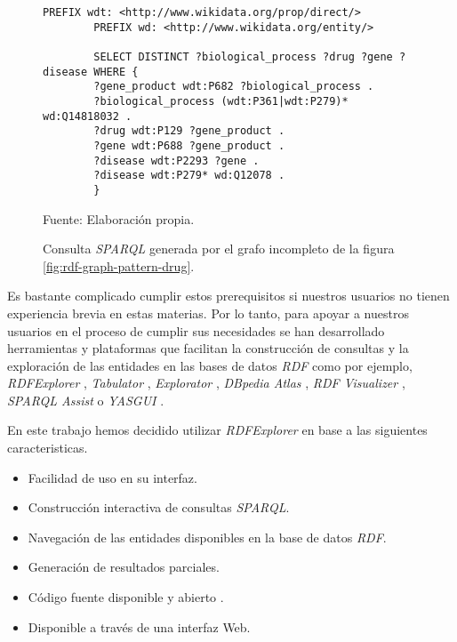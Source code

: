 \begin{figure}[ht]
    \begin{lstlisting}[language=SPARQL]
        PREFIX wdt: <http://www.wikidata.org/prop/direct/>
        PREFIX wd: <http://www.wikidata.org/entity/>
        
        SELECT DISTINCT ?biological_process ?drug ?gene ?disease WHERE {
        ?gene_product wdt:P682 ?biological_process .
        ?biological_process (wdt:P361|wdt:P279)* wd:Q14818032 .
        ?drug wdt:P129 ?gene_product .
        ?gene wdt:P688 ?gene_product .
        ?disease wdt:P2293 ?gene .
        ?disease wdt:P279* wd:Q12078 .
        }
    \end{lstlisting}
    \caption{Consulta \textit{SPARQL} generada por el grafo incompleto de la figura \ref{fig:rdf-graph-pattern-drug}.} Fuente: Elaboración propia.
    \label{code:sparql-query-drug}
\end{figure}

Es bastante complicado cumplir estos prerequisitos si nuestros usuarios no tienen experiencia brevia en estas materias. Por lo tanto, para apoyar a nuestros usuarios en el proceso de cumplir sus necesidades se han desarrollado herramientas y plataformas que facilitan la construcción de consultas y la exploración de las entidades en las bases de datos \textit{RDF} como por ejemplo, \textit{RDFExplorer} \cite{vargas2019rdf}, \textit{Tabulator} \cite{berners2006tabulator} , \textit{Explorator} \cite{araujo2009experimenting}, \textit{DBpedia Atlas} \cite{valsecchi2015dbpedia}, \textit{RDF Visualizer} \cite{sayers2004node}, \textit{SPARQL Assist} \cite{mccarthy2012sparql} o \textit{YASGUI} \cite{rietveld2017yasgui}.

En este trabajo hemos decidido utilizar \textit{RDFExplorer} en base a las siguientes caracteristicas.

\begin{itemize}
    \item Facilidad de uso en su interfaz.
    \item Construcción interactiva de consultas \textit{SPARQL}.
    \item Navegación de las entidades disponibles en la base de datos \textit{RDF}.
    \item Generación de resultados parciales.
    \item Código fuente disponible y abierto \cite{vargas2019rdfrepo}.
    \item Disponible a través de una interfaz Web.
\end{itemize}

